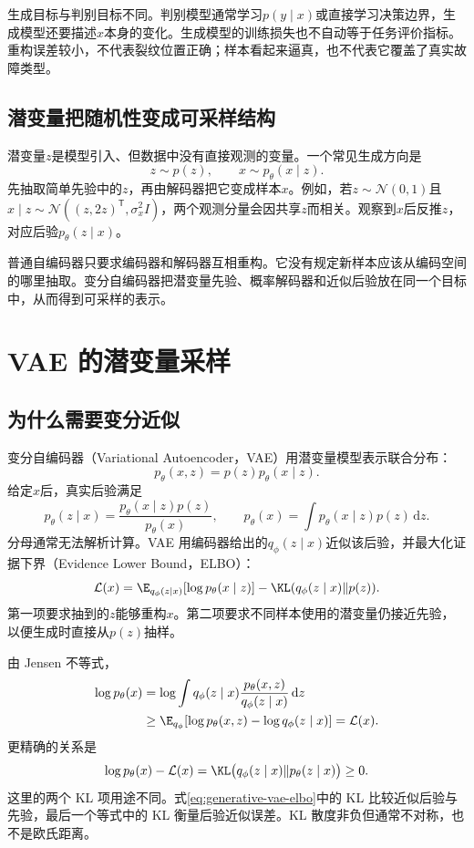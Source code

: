 生成目标与判别目标不同。判别模型通常学习$p(y\mid x)$或直接学习决策边界，生成模型还要描述$x$本身的变化。生成模型的训练损失也不自动等于任务评价指标。重构误差较小，不代表裂纹位置正确；样本看起来逼真，也不代表它覆盖了真实故障类型。

\subsection{潜变量把随机性变成可采样结构}

潜变量$z$是模型引入、但数据中没有直接观测的变量。一个常见生成方向是
\[
z\sim p(z),\qquad x\sim p_{\theta}(x\mid z).
\]
先抽取简单先验中的$z$，再由解码器把它变成样本$x$。例如，若$z\sim\mathcal N(0,1)$且$x\mid z\sim\mathcal N((z,2z)^{\mathsf T},\sigma_x^2I)$，两个观测分量会因共享$z$而相关。观察到$x$后反推$z$，对应后验$p_{\theta}(z\mid x)$。

普通自编码器只要求编码器和解码器互相重构。它没有规定新样本应该从编码空间的哪里抽取。变分自编码器把潜变量先验、概率解码器和近似后验放在同一个目标中，从而得到可采样的表示。

\section{VAE 的潜变量采样}

\subsection{为什么需要变分近似}

变分自编码器（Variational Autoencoder，VAE）用潜变量模型表示联合分布：
\begin{equation}
p_{\theta}(x,z)=p(z)p_{\theta}(x\mid z).
\end{equation}
给定$x$后，真实后验满足
\[
p_{\theta}(z\mid x)=\frac{p_{\theta}(x\mid z)p(z)}{p_{\theta}(x)},\qquad
p_{\theta}(x)=\int p_{\theta}(x\mid z)p(z)\,\mathrm dz.
\]
分母通常无法解析计算。VAE 用编码器给出的$q_{\phi}(z\mid x)$近似该后验，并最大化证据下界（Evidence Lower Bound，ELBO）：
\begin{equation}
\mathcal L(x)=\E_{q_{\phi}(z\mid x)}[\log p_{\theta}(x\mid z)]-\KL(q_{\phi}(z\mid x)\|p(z)).
\label{eq:generative-vae-elbo}
\end{equation}
第一项要求抽到的$z$能够重构$x$。第二项要求不同样本使用的潜变量仍接近先验，以便生成时直接从$p(z)$抽样。

由 Jensen 不等式，
\begin{align}
\log p_{\theta}(x)
&=\log\int q_{\phi}(z\mid x)\frac{p_{\theta}(x,z)}{q_{\phi}(z\mid x)}\,\mathrm dz\\
&\geq \E_{q_{\phi}}[\log p_{\theta}(x,z)-\log q_{\phi}(z\mid x)]
=\mathcal L(x).
\end{align}
更精确的关系是
\begin{equation}
\log p_{\theta}(x)-\mathcal L(x)=\KL\bigl(q_{\phi}(z\mid x)\|p_{\theta}(z\mid x)\bigr)\geq0.
\end{equation}
这里的两个 KL 项用途不同。式\eqref{eq:generative-vae-elbo}中的 KL 比较近似后验与先验，最后一个等式中的 KL 衡量后验近似误差。KL 散度非负但通常不对称，也不是欧氏距离。


